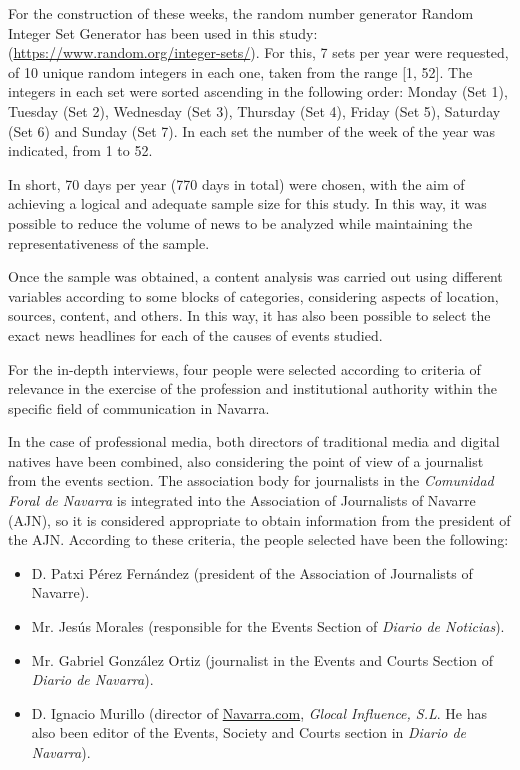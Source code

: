 For the construction of these weeks, the random number generator Random
Integer Set Generator has been used in this study:
(\url{https://www.random.org/integer-sets/}). For this, 7 sets per year were
requested, of 10 unique random integers in each one, taken from the
range [1, 52]. The integers in each set were sorted ascending in the
following order: Monday (Set 1), Tuesday (Set 2), Wednesday (Set 3),
Thursday (Set 4), Friday (Set 5), Saturday (Set 6) and Sunday (Set 7).
In each set the number of the week of the year was indicated, from 1 to
52.

In short, 70 days per year (770 days in total) were chosen, with the aim
of achieving a logical and adequate sample size for this study. In this
way, it was possible to reduce the volume of news to be analyzed while
maintaining the representativeness of the sample.

Once the sample was obtained, a content analysis was carried out using
different variables according to some blocks of categories, considering
aspects of location, sources, content, and others. In this way, it has
also been possible to select the exact news headlines for each of the
causes of events studied.

For the in-depth interviews, four people were selected according to
criteria of relevance in the exercise of the profession and
institutional authority within the specific field of communication in
Navarra.

In the case of professional media, both directors of traditional media
and digital natives have been combined, also considering the point of
view of a journalist from the events section. The association body for
journalists in the \emph{Comunidad Foral de Navarra} is integrated into
the Association of Journalists of Navarre (AJN), so it is considered
appropriate to obtain information from the president of the AJN.
According to these criteria, the people selected have been the
following:


\begin{itemize}
	\item D. Patxi Pérez Fernández (president of the Association of Journalists
of Navarre).
\item Mr. Jesús Morales (responsible for the Events Section of \emph{Diario
	de Noticias}).
\item Mr. Gabriel González Ortiz (journalist in the Events and Courts
Section of \emph{Diario de Navarra}).
\item D. Ignacio Murillo (director of \url{Navarra.com}, \emph{Glocal Influence,
	S.L}. He has also been editor of the Events, Society and Courts section
in \emph{Diario de Navarra}).
\end{itemize}

